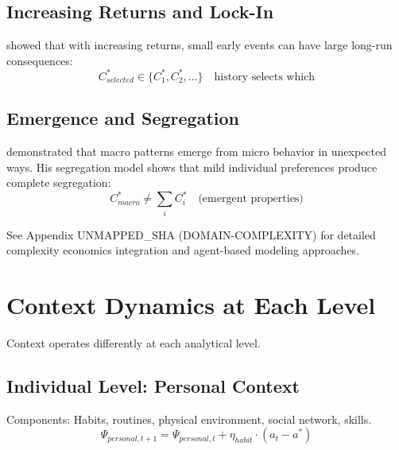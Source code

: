 \subsection{Increasing Returns and Lock-In}

\citet{arthur1989,arthur1994} showed that with increasing returns, small early
events can have large long-run consequences:
\begin{equation}
C^*_{selected} \in \{C^*_1, C^*_2, \ldots\} \quad \text{history selects which}
\label{eq:lock-in}
\end{equation}

\subsection{Emergence and Segregation}

\citet{schelling1971,schelling1978} demonstrated that macro patterns emerge
from micro behavior in unexpected ways. His segregation model shows that
mild individual preferences produce complete segregation:
\begin{equation}
C^*_{macro} \neq \sum_i C^*_i \quad \text{(emergent properties)}
\label{eq:emergence}
\end{equation}

\begin{cross-reference}
See Appendix UNMAPPED_SHA (DOMAIN-COMPLEXITY) for detailed complexity economics integration
and agent-based modeling approaches.
\end{cross-reference}



\section{Context Dynamics at Each Level}
\label{sec:context-levels}


Context operates differently at each analytical level.

\subsection{Individual Level: Personal Context}

Components: Habits, routines, physical environment, social network, skills.
\begin{equation}
\Psi_{personal, t+1} = \Psi_{personal, t} + \eta_{habit} \cdot (a_t - a^*)
\end{equation}

